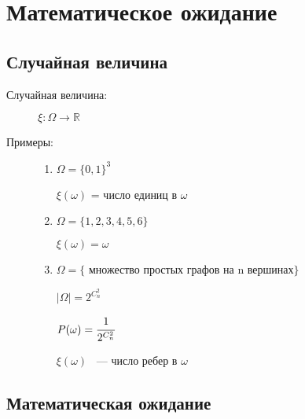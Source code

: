 \documentclass[12pt]{article}
\begin{document}
\section{Математическое ожидание}

\subsection{Случайная величина}

\begin{description}
\item[Случайная величина:] $\xi : \Omega \to \mathbb R$

\item[Примеры:]

\begin{enumerate}
\item $\Omega = \{0, 1\}^3$

$\xi (\omega)$ = число единиц в $\omega$

\item $\Omega = \{1, 2, 3, 4, 5, 6\}$

$\xi (\omega) = \omega$

\item $\Omega = \{$ множество простых графов на n вершинах$\}$

$|\Omega| = 2^{C_n^2}$

$P(\omega) = \cfrac{1}{2^{C_n^2}}$

$\xi (\omega)$ ~--- число ребер в $\omega$
\end{enumerate}
\end{description}

\subsection{Математическая ожидание}
\end{document}
